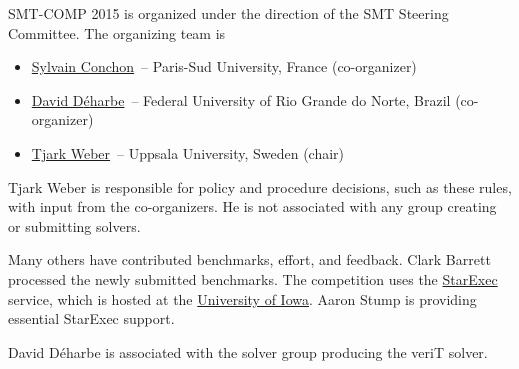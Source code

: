 \documentclass[12pt]{article}
\begin{document}
SMT-COMP 2015 is organized under the direction of the SMT Steering
Committee. The organizing team is
%
\begin{itemize}
\setlength{\itemsep}{0pt}
\item \href{https://www.lri.fr/~conchon/}{Sylvain Conchon}~--
  Paris-Sud University, France (co-organizer)
\item \href{https://www.sites.google.com/site/deharbe/}{David
  D{\'e}harbe}~-- Federal University of Rio Grande do Norte, Brazil
  (co-organizer)
\item \href{http://user.it.uu.se/~tjawe125/}{Tjark Weber}~-- Uppsala
  University, Sweden (chair)
\end{itemize}
%
Tjark Weber is responsible for policy and procedure decisions, such as
these rules, with input from the co-organizers. He is not associated
with any group creating or submitting solvers.

Many others have contributed benchmarks, effort, and feedback.  Clark
Barrett processed the newly submitted benchmarks.  The competition
uses the \href{https://www.starexec.org/}{StarExec} service, which is
hosted at the \href{http://www.cs.uiowa.edu/}{University of Iowa}.
Aaron Stump is providing essential StarExec support.

David D{\'e}harbe is associated with the solver group producing the
veriT solver.





\end{document}
